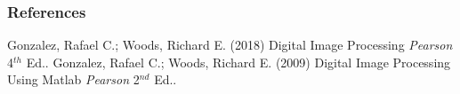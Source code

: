 \begin{frame}
\frametitle{References}
\footnotesize{
\begin{thebibliography}{99} %
 Gonzalez, Rafael C.; Woods, Richard E. (2018)
\newblock Digital Image Processing
\newblock \emph{Pearson} 4$^{th}$ Ed..
%
 Gonzalez, Rafael C.; Woods, Richard E. (2009)
\newblock Digital Image Processing Using Matlab
\newblock \emph{Pearson} 2$^{nd}$ Ed..
\end{thebibliography}
}
\end{frame}